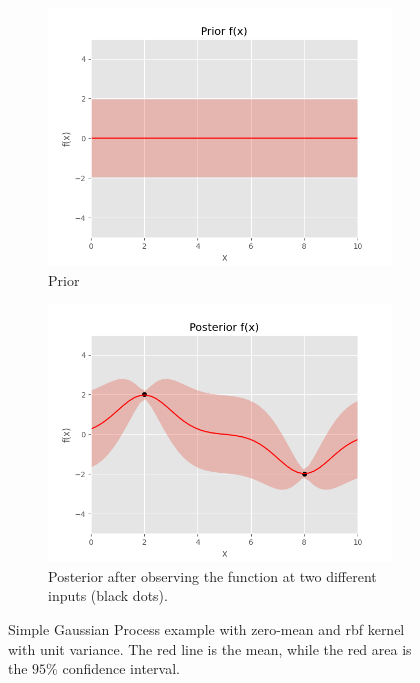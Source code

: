 \begin{figure}[h]
    \centering
    \begin{subfigure}{0.49\textwidth}
        \includegraphics[width=\textwidth]{figures/introduction-gp/prior.png}
        \caption{Prior}
        \label{fig:gp_prior}
    \end{subfigure}
    \begin{subfigure}{0.49\textwidth}
        \includegraphics[width=\textwidth]{figures/introduction-gp/posterior.png}
        \caption{Posterior after observing the function at two different inputs (black dots).}
        \label{fig:gp_posterior}
    \end{subfigure}
    \caption{Simple Gaussian Process example with zero-mean and \acrshort{rbf} kernel with unit variance. The red line is the mean, while the red area is the $95\%$ confidence interval.}
\end{figure}

